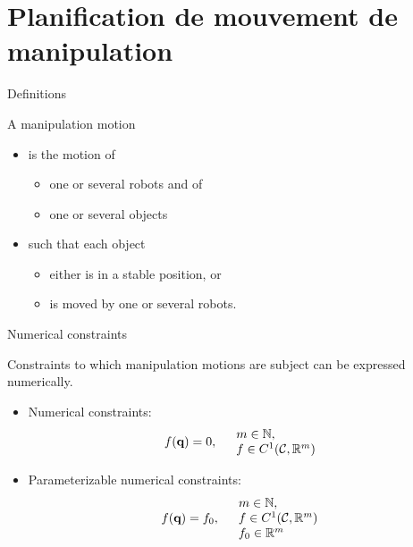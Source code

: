 %
%

\section {Planification de mouvement de manipulation}

\begin {frame} {Definitions}

A manipulation motion
\begin {itemize}
\item  is the motion of
  \begin {itemize}
  \item one or several robots and of
  \item one or several objects
  \end {itemize}
\pause
\item such that each object
  \begin{itemize}
  \item either is in a stable position, or
  \item is moved by one or several robots.
  \end {itemize}
\end {itemize}
\end {frame}


%
%
\begin {frame} {Numerical constraints}

Constraints to which manipulation motions are subject can be expressed numerically.
\begin{itemize}
\item Numerical constraints:
  $$f (\textbf{q}) = 0,\ \ \ \begin{array}{l}m\in\mathbb{N},\\ f\in C^1({\cal C},\mathbb{R}^m)\end{array} $$
\item Parameterizable numerical constraints:
  $$f (\conf) = f_0,\ \ \ \begin{array}{l}m\in\entiernaturel,\\ f\in C^1(\CS,\real^m) \\ f_0\in\real^m\end{array} $$
\end{itemize}

\end{frame}

